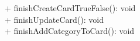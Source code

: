 { 
    + finishCreateCardTrueFalse(): void\\
    + finishUpdateCard(): void \\
    + finishAddCategoryToCard(): void\\
}{}